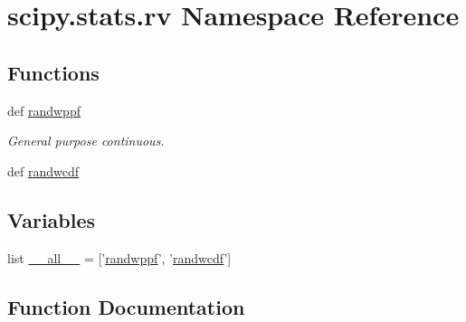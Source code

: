 \hypertarget{namespacescipy_1_1stats_1_1rv}{}\section{scipy.\+stats.\+rv Namespace Reference}
\label{namespacescipy_1_1stats_1_1rv}
\subsection*{Functions}
\begin{DoxyCompactItemize}
\item 
def \hyperlink{namespacescipy_1_1stats_1_1rv_a98aa6952095c285ea143c28e26b0b5aa}{randwppf}
\begin{DoxyCompactList}\small\item\em General purpose continuous. \end{DoxyCompactList}\item 
def \hyperlink{namespacescipy_1_1stats_1_1rv_a4082a2535e9af6917c06d3d7fffea91c}{randwcdf}
\end{DoxyCompactItemize}
\subsection*{Variables}
\begin{DoxyCompactItemize}
\item 
list \hyperlink{namespacescipy_1_1stats_1_1rv_a18083c1fd557047ee83ecbb055ee84d7}{\+\_\+\+\_\+all\+\_\+\+\_\+} = \mbox{[}'\hyperlink{namespacescipy_1_1stats_1_1rv_a98aa6952095c285ea143c28e26b0b5aa}{randwppf}', '\hyperlink{namespacescipy_1_1stats_1_1rv_a4082a2535e9af6917c06d3d7fffea91c}{randwcdf}'\mbox{]}
\end{DoxyCompactItemize}


\subsection{Function Documentation}
\hypertarget{namespacescipy_1_1stats_1_1rv_a4082a2535e9af6917c06d3d7fffea91c}{}
